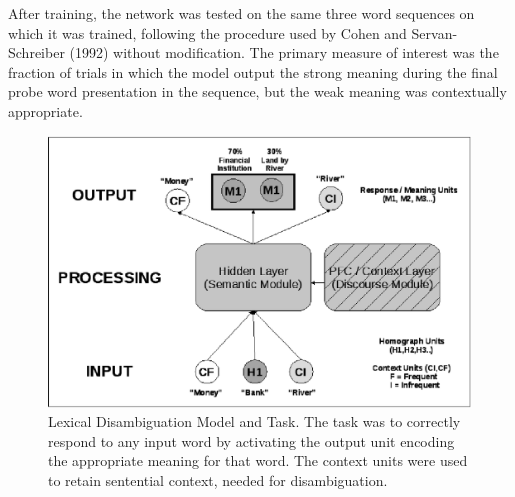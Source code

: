 
After training, the network was tested on the same three word sequences on which it was trained, following the procedure used by Cohen and Servan-Schreiber (1992) without modification. The primary measure of interest was the fraction of trials in which the model output the strong meaning during the final probe word presentation in the sequence, but the weak meaning was contextually appropriate.

\begin{figure}[tp]
\begin{center}
	\includegraphics[width=115mm]{figures/lexAmb_network_cartoon.eps}
\end{center}
\caption{Lexical Disambiguation Model and Task.  The task was to correctly respond to any input word by activating the output unit encoding the appropriate meaning for that word. The context units were used to retain sentential context, needed for disambiguation.}
\label{lexamb-model-task}
\end{figure} 

